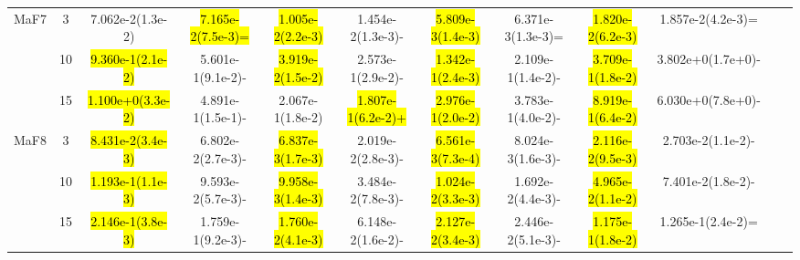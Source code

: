 \documentclass[a4paper,fleqn]{cas-dc}
\newcommand{\highlight}[1]{
	\begingroup
	\sethlcolor{Seashell}%
	\hl{#1}%
	\endgroup
}
\begin{document}
\begin{sloppypar}
\begin{table}[ht]
{\begin{tabular}{cccccccccccc}
				
				
				
				
				
				
				\multirow{3}{*}{MaF7}&3 &7.062e-2(1.3e-2)	&\highlight{7.165e-2(7.5e-3)=}	&\highlight{1.005e-2(2.2e-3)}	&1.454e-2(1.3e-3)-	&\highlight{5.809e-3(1.4e-3)}	&6.371e-3(1.3e-3)=	&\highlight{1.820e-2(6.2e-3)}	&1.857e-2(4.2e-3)=\\	
				\multirow{3}{*}{~}&10 	&\highlight{9.360e-1(2.1e-2)}	&5.601e-1(9.1e-2)-	&\highlight{3.919e-2(1.5e-2)}	&2.573e-1(2.9e-2)-	&\highlight{1.342e-1(2.4e-3)}	&2.109e-1(1.4e-2)-	&\highlight{3.709e-1(1.8e-2)}	&3.802e+0(1.7e+0)-\\	
				\multirow{3}{*}{~}&15 	&\highlight{1.100e+0(3.3e-2)}	&4.891e-1(1.5e-1)-	&2.067e-1(1.8e-2)	&\highlight{1.807e-1(6.2e-2)+}	&\highlight{2.976e-1(2.0e-2)}	&3.783e-1(4.0e-2)-	&\highlight{8.919e-1(6.4e-2)}	&6.030e+0(7.8e+0)-\\	
				\hline
				
				
				
				
				
				
				\multirow{3}{*}{MaF8}&3 &\highlight{8.431e-2(3.4e-3)}	&6.802e-2(2.7e-3)-	&\highlight{6.837e-3(1.7e-3)}	&2.019e-2(2.8e-3)-	&\highlight{6.561e-3(7.3e-4)}	&8.024e-3(1.6e-3)-	&\highlight{2.116e-2(9.5e-3)}	&2.703e-2(1.1e-2)-\\	
				\multirow{3}{*}{~}&10  	&\highlight{1.193e-1(1.1e-3)}	&9.593e-2(5.7e-3)-	&\highlight{9.958e-3(1.4e-3)}	&3.484e-2(7.8e-3)-	&\highlight{1.024e-2(3.3e-3)}	&1.692e-2(4.4e-3)-	&\highlight{4.965e-2(1.1e-2)}	&7.401e-2(1.8e-2)-\\	
				\multirow{3}{*}{~}&15 &\highlight{2.146e-1(3.8e-3)}	&1.759e-1(9.2e-3)-	&\highlight{1.760e-2(4.1e-3)}	&6.148e-2(1.6e-2)-	&\highlight{2.127e-2(3.4e-3)}	&2.446e-2(5.1e-3)-	&\highlight{1.175e-1(1.8e-2)}	&1.265e-1(2.4e-2)=\\	
				\hline
				
				
				
				
				

\end{tabular}}
\end{table}
\end{sloppypar}
\end{document}
